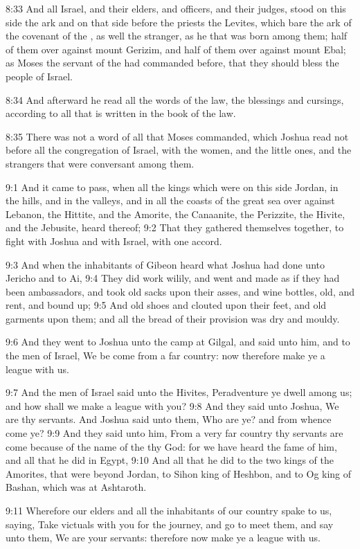 8:33 And all Israel, and their elders, and officers, and their judges, stood on this side the ark and on that side before the priests the Levites, which bare the ark of the covenant of the \LORD, as well the stranger, as he that was born among them; half of them over against mount Gerizim, and half of them over against mount Ebal; as Moses the servant of the \LORD had commanded before, that they should bless the people of Israel.

8:34 And afterward he read all the words of the law, the blessings and cursings, according to all that is written in the book of the law.

8:35 There was not a word of all that Moses commanded, which Joshua read not before all the congregation of Israel, with the women, and the little ones, and the strangers that were conversant among them.

9:1 And it came to pass, when all the kings which were on this side Jordan, in the hills, and in the valleys, and in all the coasts of the great sea over against Lebanon, the Hittite, and the Amorite, the Canaanite, the Perizzite, the Hivite, and the Jebusite, heard thereof; 9:2 That they gathered themselves together, to fight with Joshua and with Israel, with one accord.

9:3 And when the inhabitants of Gibeon heard what Joshua had done unto Jericho and to Ai, 9:4 They did work wilily, and went and made as if they had been ambassadors, and took old sacks upon their asses, and wine bottles, old, and rent, and bound up; 9:5 And old shoes and clouted upon their feet, and old garments upon them; and all the bread of their provision was dry and mouldy.

9:6 And they went to Joshua unto the camp at Gilgal, and said unto him, and to the men of Israel, We be come from a far country: now therefore make ye a league with us.

9:7 And the men of Israel said unto the Hivites, Peradventure ye dwell among us; and how shall we make a league with you?  9:8 And they said unto Joshua, We are thy servants. And Joshua said unto them, Who are ye? and from whence come ye?  9:9 And they said unto him, From a very far country thy servants are come because of the name of the \LORD thy God: for we have heard the fame of him, and all that he did in Egypt, 9:10 And all that he did to the two kings of the Amorites, that were beyond Jordan, to Sihon king of Heshbon, and to Og king of Bashan, which was at Ashtaroth.

9:11 Wherefore our elders and all the inhabitants of our country spake to us, saying, Take victuals with you for the journey, and go to meet them, and say unto them, We are your servants: therefore now make ye a league with us.


